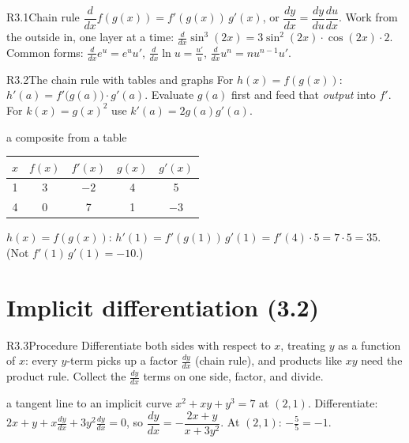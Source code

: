 \documentclass{apcalc}
\begin{document}
\begin{rulebox}{R3.1}{Chain rule}
$\dfrac{d}{dx}f(g(x))=f'(g(x))\,g'(x)$, or $\dfrac{dy}{dx}=\dfrac{dy}{du}\dfrac{du}{dx}$. Work from the outside in, one layer at a time:
$\frac{d}{dx}\sin^3(2x)=3\sin^2(2x)\cdot\cos(2x)\cdot2$. Common forms: $\frac{d}{dx}e^{u}=e^{u}u'$, $\frac{d}{dx}\ln u=\frac{u'}{u}$, $\frac{d}{dx}u^n=nu^{n-1}u'$.
\end{rulebox}

\begin{rulebox}{R3.2}{The chain rule with tables and graphs}
For $h(x)=f(g(x))$: $h'(a)=f'\big(g(a)\big)\cdot g'(a)$. Evaluate $g(a)$ first and feed that \emph{output} into $f'$. For $k(x)=g(x)^2$ use $k'(a)=2g(a)g'(a)$.
\end{rulebox}

\begin{example}{a composite from a table}
\begin{center}\small\begin{tabular}{|c|c|c|c|c|}\hline $x$ & $f(x)$ & $f'(x)$ & $g(x)$ & $g'(x)$\\\hline 1 & 3 & $-2$ & 4 & 5\\\hline 4 & 0 & 7 & 1 & $-3$\\\hline\end{tabular}\end{center}
$h(x)=f(g(x))$: $h'(1)=f'(g(1))\,g'(1)=f'(4)\cdot5=7\cdot5=35$.  (Not $f'(1)\,g'(1)=-10$.)
\end{example}

\section{Implicit differentiation (3.2)}

\begin{rulebox}{R3.3}{Procedure}
Differentiate both sides with respect to $x$, treating $y$ as a function of $x$: every $y$-term picks up a factor $\frac{dy}{dx}$ (chain rule), and products like $xy$ need the product rule. Collect the $\frac{dy}{dx}$ terms on one side, factor, and divide.
\end{rulebox}

\begin{example}{a tangent line to an implicit curve}
$x^2+xy+y^3=7$ at $(2,1)$. Differentiate: $2x+y+x\frac{dy}{dx}+3y^2\frac{dy}{dx}=0$, so $\dfrac{dy}{dx}=-\dfrac{2x+y}{x+3y^2}$. At $(2,1)$: $-\frac{5}{5}=-1$. 
\end{example}
\end{document}

